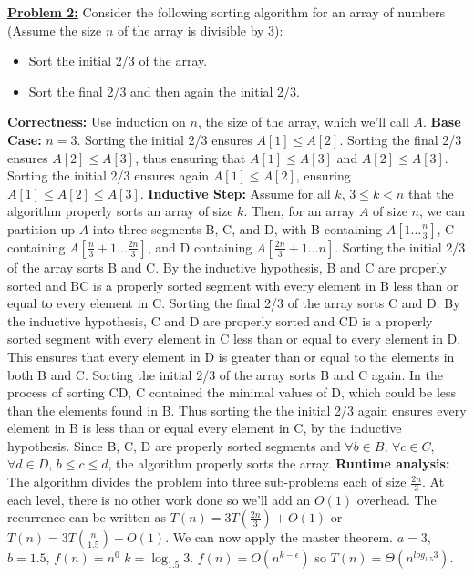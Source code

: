 \documentclass[11pt]{article}
\begin{document}
\begin{flushleft}
		\item \textbf {\underline{Problem 2:}} Consider the following sorting algorithm for an array of numbers (Assume the size $n$ of the array is divisible by 3):
		\begin{itemize}
			\item   Sort the initial 2/3 of the array.
			\item   Sort the final 2/3 and then again the initial 2/3.
		\end{itemize}
		\textbf{Correctness:} Use induction on $n$, the size of the array, which we'll call $A$. 
		\newline
		\textbf{Base Case:} $n = 3$. Sorting the initial 2/3 ensures $A[1] \leq A[2]$. Sorting the final 2/3 ensures $A[2] \leq A[3]$, thus ensuring that $A[1] \leq A[3]$ and $A[2] \leq A[3]$. Sorting the initial 2/3 ensures again $A[1] \leq A[2]$, ensuring $A[1] \leq A[2] \leq A[3]$.  
		\newline
		\textbf{Inductive Step:} Assume for all $k$, $3 \leq k < n$ that the algorithm properly sorts an array of size $k$. Then, for an array $A$ of size $n$, we can partition up $A$ into three segments B, C, and D, with B containing 
		$A[1 \dots \frac{n}{3}]$, C containing $A[\frac{n}{3} + 1 \dots \frac{2n}{3}]$, and D containing $A[\frac{2n}{3} + 1 \dots n]$. 
		\newline
		Sorting the initial 2/3 of the array sorts B and C. By the inductive hypothesis, B and C are properly sorted and BC is a properly sorted segment with every element in B less than or equal to every element in C.
		\newline
		Sorting the final 2/3 of the array sorts C and D. By the inductive hypothesis, C and D are properly sorted and CD is a properly sorted segment with every element in C less than or equal to every element in D. This ensures that every element in D is greater than or equal to the elements in both B and C. 
		\newline
		Sorting the initial 2/3 of the array sorts B and C again. In the process of sorting CD, C contained the minimal values of D, which could be less than the elements found in B. Thus sorting the the initial 2/3 again ensures every element in B is less than or equal every element in C, by the inductive hypothesis.
		\newline
		Since B, C, D are properly sorted segments and $\forall b \in B$, $\forall c \in C$, $\forall d \in D$, $b \leq c \leq d$, the algorithm properly sorts the array.
		\newline
		\textbf{Runtime analysis:} The algorithm divides the problem into three sub-problems each of size $\frac{2n}{3}$. At each level, there is no other work done so we'll add an $O(1)$ overhead. The recurrence can be written as $T(n) = 3T(\frac{2n}{3}) + O(1)$ or $T(n) = 3T(\frac{n}{1.5}) + O(1)$. We can now apply the master theorem. $a = 3$, $b = 1.5$, $f(n) = n^0$ $k = \log_{1.5}3$. $f(n) = O(n^{k - \epsilon})$ so $T(n) = \Theta(n^{log_{1.5}3})$.

\end{flushleft}
\end{document}
